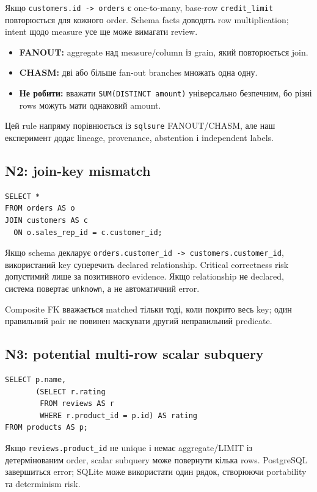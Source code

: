 \documentclass[11pt,a4paper]{article}
\newcommand{\unknown}{\texttt{unknown}}
\begin{document}
Якщо \texttt{customers.id -> orders} є one-to-many, base-row
\texttt{credit\_limit} повторюється для кожного order. Schema facts доводять row
multiplication; intent щодо measure усе ще може вимагати review.

\begin{itemize}
\item \textbf{FANOUT:} aggregate над measure/column із grain, який повторюється join.
\item \textbf{CHASM:} дві або більше fan-out branches множать одна одну.
\item \textbf{Не робити:} вважати \texttt{SUM(DISTINCT amount)} універсально безпечним,
      бо різні rows можуть мати однаковий amount.
\end{itemize}

Цей rule напряму порівнюється із \texttt{sqlsure} FANOUT/CHASM, але наш експеримент
додає lineage, provenance, abstention і independent labels.

\subsection{N2: join-key mismatch}

\begin{lstlisting}[style=sqlstyle]
SELECT *
FROM orders AS o
JOIN customers AS c
  ON o.sales_rep_id = c.customer_id;
\end{lstlisting}

Якщо schema декларує \texttt{orders.customer\_id -> customers.customer\_id},
використаний key суперечить declared relationship. Critical correctness risk
допустимий лише за позитивного evidence. Якщо relationship не declared, система
повертає \unknown, а не автоматичний error.

Composite FK вважається matched тільки тоді, коли покрито весь key; один правильний
pair не повинен маскувати другий неправильний predicate.

\subsection{N3: potential multi-row scalar subquery}

\begin{lstlisting}[style=sqlstyle]
SELECT p.name,
       (SELECT r.rating
        FROM reviews AS r
        WHERE r.product_id = p.id) AS rating
FROM products AS p;
\end{lstlisting}

Якщо \texttt{reviews.product\_id} не unique і немає aggregate/LIMIT із
детермінованим order, scalar subquery може повернути кілька rows. PostgreSQL
завершиться error; SQLite може використати один рядок, створюючи portability та
determinism risk.
\end{document}

